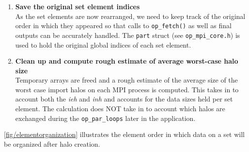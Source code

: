 \documentclass[11pt]{article}
\begin{document}
\begin{enumerate}
\item \textbf{Save the original set element indices}\\
As the set elements are now rearranged, we need to keep track of the original order in which they appeared so that calls
to \texttt{op\_fetch()} as well as final outputs can be accurately handled. The \texttt{part} struct
(see \texttt{op\_mpi\_core.h}) is used to hold the original global indices of each set element.

\item \textbf{Clean up and compute rough estimate of average worst-case halo
size}\\
Temporary arrays are freed and a rough estimate of the average size of
the worst case import halos on each MPI process is computed. This takes in to
account both the \textit{ieh} and \textit{inh} and accounts for the data sizes
held per set element. The calculation does NOT take in to account which halos
are exchanged during the \texttt{op\_par\_loops} later in the application.
\end{enumerate}
\noindent \figurename{ \ref{fig/elementorganization}} illustrates the element
order in which data on a set will be organized after halo creation.


\end{document}
